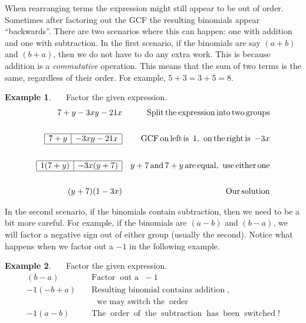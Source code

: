 \documentclass[12pt]{book}
\theoremstyle{definition}
\newtheorem{example}{Example}
\newcommand{\tmop}[1]{\ensuremath{\operatorname{#1}}}
\begin{document}
When rearranging terms the expression might still appear to be out of order. Sometimes after factoring out the GCF the resulting binomials appear ``backwards''. There are two scenarios where this can happen: one with addition and one with subtraction. In the first scenario, if the binomials are say $(a + b)$ and $(b + a)$, then we do not have to do any extra work.  This is because addition is a {\it commutative} operation.  This means that the sum of two terms is the same, regardless of their order.  For example, $5 + 3 = 3 + 5 = 8$.

\begin{example}~~~Factor the given expression.
  \begin{eqnarray*}
    7 + y - 3 x y - 21 x &  & \tmop{Split} \tmop{the} \tmop{expression}
    \tmop{into} \tmop{two} \tmop{groups}\\
&&\\
    \begin{array}{|l|l|}
      \hline
      7 + y & - 3 x y - 21 x\\
      \hline
    \end{array} &  & \tmop{GCF} \tmop{on} \tmop{left} \tmop{is~} 1, \tmop{~on}
    \tmop{the} \tmop{right} \tmop{is~} - 3 x\\
&&\\
    \begin{array}{|l|l|}
      \hline
      1 (7 + y) & - 3 x (y + 7)\\
      \hline
    \end{array} &  & y + 7 \tmop{and} 7 + y \tmop{are} \tmop{equal},
    \tmop{~use} \tmop{either} \tmop{one}\\
&&\\
    (y + 7) (1 - 3 x) &  & \tmop{Our} \tmop{solution}
  \end{eqnarray*}
\end{example}

In the second scenario, if the binomials contain subtraction, then we need to be a bit more careful. For example, if the binomials are $(a - b)$ and $(b - a)$, we will factor a negative sign out of either group (usually the second). Notice what happens when we factor out a $-1$ in the following example.

\begin{example}~~~Factor the given expression.
  \begin{eqnarray*}
    (b - a) &  & \tmop{Factor} \tmop{out~a~} - 1\\
    - 1 (- b + a) &  & \tmop{Resulting~binomial~contains~addition},\\
		&&~~~\tmop{we~may~switch~the} \tmop{order}\\
    - 1 (a - b) &  & \tmop{The} \tmop{order} \tmop{of} \tmop{the}
    \tmop{subtraction} \tmop{has} \tmop{been} \tmop{switched} !
  \end{eqnarray*}
\end{example}
  
\end{document}
